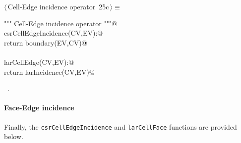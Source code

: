 \documentclass[11pt,oneside]{article}    %
\begin{document}
\begin{flushleft} \small \label{scrap41}
\protect{}$\langle\,$Cell-Edge incidence operator\nobreak\ {\footnotesize 25c}$\,\rangle\equiv$
\vspace{-1ex}
\begin{list}{}{} \item
\mbox{}\verb@""" Cell-Edge incidence operator """@\\
\mbox{}\verb@def csrCellEdgeIncidence(CV,EV):@\\
\mbox{}\verb@     return boundary(EV,CV)@\\
\mbox{}\verb@@\\
\mbox{}\verb@def larCellEdge(CV,EV):@\\
\mbox{}\verb@    return larIncidence(CV,EV)@\\
\mbox{}\verb@@{\NWsep}
\end{list}
\vspace{-1ex}
\footnotesize\addtolength{\baselineskip}{-1ex}
\begin{list}{}{\setlength{\itemsep}{-\parsep}\setlength{\itemindent}{-\leftmargin}}
\item \NWtxtMacroRefIn\ .
\end{list}
\end{flushleft}

\paragraph{Face-Edge incidence}
Finally, the \texttt{csrCellEdgeIncidence} and \texttt{larCellFace} functions are provided below.
\end{document}
